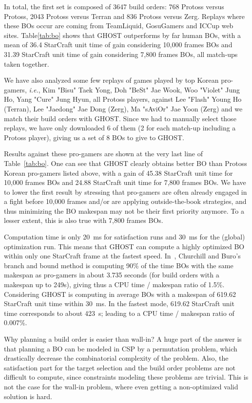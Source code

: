 \documentclass[journal]{IEEEtran}
\newcommand{\csp}{\textsc{CSP}\xspace}
\newcommand{\ghost}{\textsc{GHOST}\xspace}
\newcommand{\ie}{\textit{i.e.}}
\begin{document}
In total, the first set is  composed of 3647 build orders: 768 Protoss
versus  Protoss, 2043  Protoss versus  Terran and  836 Protoss  versus
Zerg.   Replays where  these  BOs occur  are  coming from  TeamLiquid,
GosuGamers and  ICCup web sites.  Table\ref{tab:bo}  shows that \ghost
outperforms by far human BOs, with  a mean of 36.4 StarCraft unit time
of gain considering 10,000 frames BOs and 31.39 StarCraft unit time of
gain considering 7,800 frames BOs, all match-ups taken together.

We have also  analyzed some few replays of games  played by top Korean
pro-gamers,  \ie, Kim  "Bisu"  Taek  Yong, Doh  "BeSt"  Jae Wook,  Woo
"Violet" Jung Ho, Yang "Cure"  Jung Hyun, all Protoss players, against
Lee  "Flash" Young  Ho (Terran),  Lee  "Jaedong" Jae  Dong (Zerg),  Ma
"sAviOr" Jae Yoon (Zerg) and we  match their build orders with \ghost.
Since we had to manually select those replays, we have only downloaded
6 of them (2 for each  match-up including a Protoss player), giving us
a set of 8 BOs to give to \ghost.

Results against  these pro-gamers are shown  at the very last  line of
Table~\ref{tab:bo}.  One can see that \ghost clearly obtains better BO
than  Protoss Korean  pro-gamers listed  above, with  a gain  of 45.38
StarCraft unit  time for  10,000 frames BOs  and 24.88  StarCraft unit
time  for 7,800  frames BOs.  We  have to  lower the  first result  by
stressing that pro-gamers are often  already engaged in a fight before
10,000 frames and/or are applying outside-the-book strategies, and thus
minimizing the BO makespan may not be their first priority anymore. To
a lesser extent, this is also true with 7,800 frames BOs.

Computation time is  only 20~ms for satisfaction runs and  30~ms for the
(global) optimization run. This means that \ghost can compute a highly
optimized BO  within only one StarCraft frame  at the fastest
speed. In~\cite{ChurchillB11},  Churchill and Buro's branch  and bound
method  is computing  90\%  of the  time BOs  with the  same
makespan as pro-gamers in about 3.735 seconds (for build orders with a
makespan  up to  249s), giving  thus a  CPU time  / makespan  ratio of
1.5\%. Considering \ghost is computing  in average BOs with a
makespan of  619.62 StarCraft  unit time within  30~ms. In  the fastest
mode, 619.62 StarCraft unit time corresponds to about 423~s; leading to
a CPU time / makespan ratio of 0.007\%.

Why planning a build order is easier  than wall-in? A huge part of the
answer is  that planning  a BO can be modeled  in \csp  by a
permutation  problem,  which  drastically decrease  the  combinatorial
complexity of the problem. Also,  the satisfaction part for the target
selection and the  build order problems are not  difficult to compute,
since constraints  modeling these problems  are trivial.  This  is not
the case for  the wall-in problem, where even  getting a non-optimized
valid solution is hard.
\end{document}
